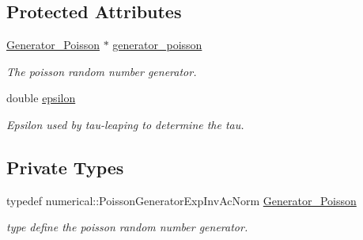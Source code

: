 \subsection*{Protected Attributes}
\begin{CompactItemize}
\item 
\hypertarget{class_tau_leaping_9c3861c049339052cbf56da45819d987}{
\hyperlink{class_tau_leaping_4d5a24c9b87da3c1a87272f131a8f896}{Generator\_\-Poisson} $\ast$ \hyperlink{class_tau_leaping_9c3861c049339052cbf56da45819d987}{generator\_\-poisson}}
\label{class_tau_leaping_9c3861c049339052cbf56da45819d987}

\begin{CompactList}\small\item\em The poisson random number generator. \item\end{CompactList}\item 
\hypertarget{class_tau_leaping_c994570f0decac43f784f5e1ec045646}{
double \hyperlink{class_tau_leaping_c994570f0decac43f784f5e1ec045646}{epsilon}}
\label{class_tau_leaping_c994570f0decac43f784f5e1ec045646}

\begin{CompactList}\small\item\em Epsilon used by tau-leaping to determine the tau. \item\end{CompactList}\end{CompactItemize}
\subsection*{Private Types}
\begin{CompactItemize}
\item 
typedef numerical::PoissonGeneratorExpInvAcNorm \hyperlink{class_tau_leaping_4d5a24c9b87da3c1a87272f131a8f896}{Generator\_\-Poisson}
\begin{CompactList}\small\item\em type define the poisson random number generator. \item\end{CompactList}\end{CompactItemize}
